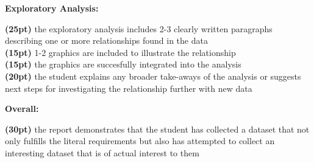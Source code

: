 \documentclass[12pt]{article}
\begin{document}
\newpage

\textbf{Exploratory Analysis:} \vspace{6pt}

\underline{\hspace{1cm}} \textbf{(25pt)}
  the exploratory analysis includes 2-3 clearly written paragraphs
  describing one or more relationships found in the data \\
\underline{\hspace{1cm}} \textbf{(15pt)}
  1-2 graphics are included to illustrate the relationship \\
\underline{\hspace{1cm}} \textbf{(15pt)}
  the graphics are succesfully integrated into the analysis \\
\underline{\hspace{1cm}} \textbf{(20pt)}
  the student explains any broader take-aways of the analysis
  or suggests next steps for investigating the relationship further
  with new data \\

\medskip

\textbf{Overall:} \vspace{6pt}

\underline{\hspace{1cm}} \textbf{(30pt)}
  the report demonstrates that the student has collected a dataset
  that not only fulfills the literal requirements but also has
  attempted to collect an interesting dataset that is of actual
  interest to them \\
\end{document}
